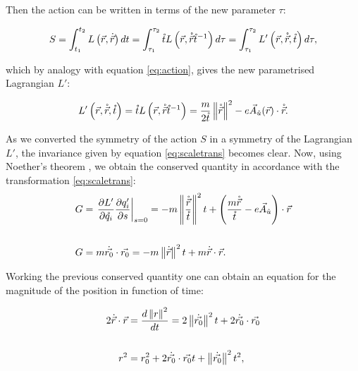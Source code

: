 Then the action can be written in terms of the new parameter $\tau$:

\begin{equation*}
S = \int_{t_1}^{t_2}L\left( \vec{r},\dot{\vec{r}} \right)dt = \int_{\tau_1}^{\tau_2}\mathring{t}L\left( \vec{r},\mathring{\vec{r}}{\mathring{t}}^{-1} \right)d\tau                                                                    = \int_{\tau_1}^{\tau_2}L'\left( \vec{r},\mathring{\vec{r}},\mathring{t} \right)d\tau,
\label{eq:actiontau}
\end{equation*}

which by analogy with equation \eqref{eq:action}, gives the new parametrised Lagrangian $L'$:

\begin{equation*}
L'\left( \vec{r},\mathring{\vec{r}},\mathring{t} \right) = \mathring{t}L\left( \vec{r},\mathring{\vec{r}}{\mathring{t}}^{-1} \right) = \frac{m}{2\mathring{t}}\left\lVert \mathring{\vec{r}} \right\rVert^2 - e\vec{A}_{\hat{u}}(\vec{r})\cdot\mathring{\vec{r}}.
\end{equation*}

As we converted the symmetry of the action $S$ in a symmetry of the Lagrangian $L'$, the invariance given by  equation \eqref{eq:scaletrans} becomes clear. Now, using Noether's theorem \cite{scheck}, we obtain the conserved quantity in accordance with the transformation \eqref{eq:scaletrans}: \\

\begin{align*}
G &= \left. \frac{\partial L'}{\partial \mathring{q_i}} \frac{\partial q'_i}{\partial s} \right|_{s=0} = -m\left\lVert \frac{\mathring{\vec{r}}}{\mathring{t}} \right\rVert^2t + \left( \frac{m\mathring{\vec{r}}}{\mathring{t}} - e\vec{A}_{\hat{u}} \right)\cdot \vec{r}\\
\\
G &= m\dot{\vec{r_0}}\cdot\vec{r_0} = -m\left\lVert \dot{\vec{r}} \right\rVert^2t + m\dot{\vec{r}}\cdot\vec{r} .
\end{align*}

Working the previous conserved quantity one can obtain an equation for the magnitude of the position in function of time:

\begin{align*}
\nonumber
 2\dot{\vec{r}}\cdot\vec{r} &= \frac{d\left\lVert r \right\rVert^2}{dt} = 2\left\lVert \dot{\vec{r_0}} \right\rVert^2t + 2\dot{\vec{r_0}}\cdot\vec{r_0}\\
 \\ 
 r^2 &= r_0^2 +2\dot{\vec{r_0}}\cdot\vec{r_0}t +\left\lVert \dot{\vec{r_0}} \right\rVert^2t^2 ,
\end{align*}

